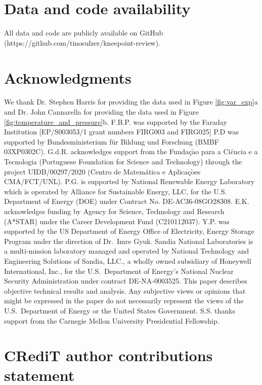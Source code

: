 \documentclass[journal=jpclcd,manuscript=article]{achemso}
\newcommand{\pbox}[1]{{
\fbox{
\parbox{0.8\textwidth}{  \fbox{$\triangleright$\textcolor{blue}{\textbf{Peter}:}} 
#1
}}}}
\begin{document}
\section{Data and code availability}

All data and code are publicly available on GitHub (https://github.com/tinosulzer/kneepoint-review).

\section{Acknowledgments}

We thank Dr. Stephen Harris for providing the data used in Figure \ref{fig:var_exp}a and Dr. John Cannarella for providing the data used in Figure \ref{fig:temperature_and_pressure}b.
F.B.P. was supported by the Faraday Institution [EP/S003053/1 grant numbers FIRG003 and FIRG025]
P.D was supported by Bundesministerium für Bildung und Forschung (BMBF 03XP0302C).
G.d.R. acknowledges support from the {Funda{\c c}$\tilde{\text{a}}$o para a Ci$\hat{e}$ncia e a Tecnologia} (Portuguese Foundation for Science and Technology) through the project UIDB/00297/2020 (Centro de Matem\'atica e Aplica\c c$\tilde{\text{o}}$es CMA/FCT/UNL).
P.G. is supported by National Renewable Energy Laboratory which is operated by Alliance for Sustainable Energy, LLC, for the U.S. Department of Energy (DOE) under Contract No. DE-AC36-08GO28308. 
E.K. acknowledges funding by Agency for Science, Technology and Research (A*STAR) under the Career Development Fund (C210112037).
Y.P. was supported by the US Department of Energy Office of Electricity, Energy Storage Program under the direction of Dr.~Imre Gyuk. Sandia National Laboratories is a multi-mission laboratory managed and operated by National Technology and Engineering Solutions of Sandia, LLC., a wholly owned subsidiary of Honeywell International, Inc., for the U.S.~Department of Energy’s National Nuclear Security Administration under contract DE-NA-0003525.
This paper describes objective technical results and analysis. Any subjective views or opinions that might be expressed in the paper do not necessarily represent the views of the U.S.~Department of Energy or the United States Government.
S.S. thanks support from the Carnegie Mellon University Presidential Fellowship.

\section{CRediT author contributions statement}
\end{document}
